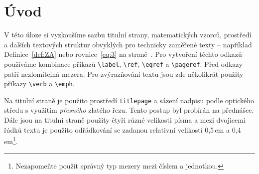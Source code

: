 \documentclass[twocolumn,a4paper,11pt]{article}
\theoremstyle{definition}
\theoremstyle{plain}
\begin{document}

\clearpage
{}

\section*{Úvod}
\label{sec:intro}
V této úloze si vyzkoušíme sazbu titulní strany, matematických vzorců, prostředí a dalších textových struktur obvyklých pro technicky zaměřené texty -- například Definice~\ref{def:ZA} nebo rovnice~\eqref{eq:3} na straně~\pageref{sec:rovnice}. Pro vytvoření těchto odkazů používáme kombinace příkazů \verb|\label|, \verb|\ref|, \verb|\eqref| a \verb|\pageref|. Před odkazy patří nezlomitelná mezera. Pro zvýrazňování textu jsou zde několikrát použity příkazy \verb|\verb| a \verb|\emph|.

Na titulní straně je použito prostředí \verb|titlepage| a sázení nadpisu podle optického středu s využitím \emph{přesného} zlatého řezu. Tento postup byl probírán na přednášce. Dále jsou na titulní straně použity čtyři různé velikosti písma a mezi dvojicemi řádků textu je použito odřádkování se zadanou relativní velikostí 0,5\,em a 0,4\,em\footnote{Nezapomeňte použít správný typ mezery mezi číslem a jednotkou.}.
\end{document}
